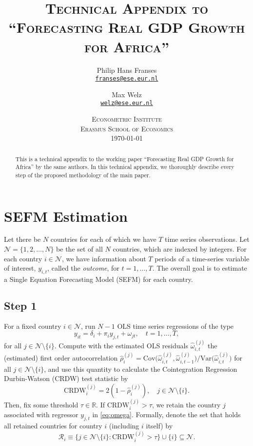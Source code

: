 \documentclass{article}
\title{\textsc{Technical Appendix to ``Forecasting Real GDP Growth for Africa''}}
\author{Philip Hans Franses \\
  \href{mailto:franses@ese.eur.nl}{\texttt{franses@ese.eur.nl}}
  \and
  Max Welz \\
  \href{mailto:welz@ese.eur.nl}{\texttt{welz@ese.eur.nl}}}
\date{%
    \textsc{Econometric Institute\\ Erasmus School of Economics}\\[2ex]%
    \today}
\begin{document}
\maketitle

\begin{abstract}
   \noindent This is a technical appendix to the working paper ``Forecasting Real GDP Growth for Africa'' by the same authors. In this technical appendix, we thoroughly describe every step of the proposed methodology of the main paper.
\end{abstract}

\section{SEFM Estimation}
Let there be $N$ countries for each of which we have $T$ time series observations. Let $\mathcal{N} = \{1,2,\dots,N\}$ be the set of all $N$ countries, which are indexed by integers. For each country $i \in \mathcal{N}$, we have information about $T$ periods of a time-series variable of interest, $y_{i,t}$, called the \textit{outcome}, for $t=1,\dots,T$. The overall goal is to estimate a Single Equation Forecasting Model (SEFM) for each country.

\subsection{Step 1}
For a fixed country $i \in \mathcal{N}$, run $N-1$ OLS time series regressions of the type
\begin{equation}
    y_{it} = \delta_i + \pi_i y_{j,t} + \omega_{jt}, \quad t=1,\dots,T, \label{eq:omega}
\end{equation}
for all $j \in \mathcal{N}\setminus \{i\}$. Compute with the estimated OLS residuals $\hat{\omega}_{i,t}^{(j)}$ the (estimated) first order autocorrelation $\hat{\rho}_i^{(j)} = \text{Cov} \big( \hat{\omega}_{i,t}^{(j)}, \hat{\omega}_{i,t-1}^{(j)} \big) / \text{Var} \big( \hat{\omega}_{i,t}^{(j)} \big)$ for all $j \in \mathcal{N}\setminus\{i\}$, and use this quantity to calculate the Cointegration Regression Durbin-Watson (CRDW) test statistic by
 \begin{equation}
     \text{CRDW}_i^{(j)} = 2(1 - \hat{\rho}_i^{(j)}), \quad j \in \mathcal{N}\setminus \{i\}.
 \end{equation}
Then, fix some threshold $\tau \in \mathbb{R}$. If $\text{CRDW}_i^{(j)} > \tau$, we retain the country $j$ associated with regressor $y_{j,t}$ in \eqref{eq:omega}. 
Formally, denote the set that holds all retained countries for country $i$ (including $i$ itself) by 
\[
\mathcal{R}_i \equiv \big\{ j \in \mathcal{N}\setminus \{i\} : \text{CRDW}_i^{(j)} >\tau \big\} \cup \{i\} \subseteq \mathcal{N}.
\]
\end{document}
